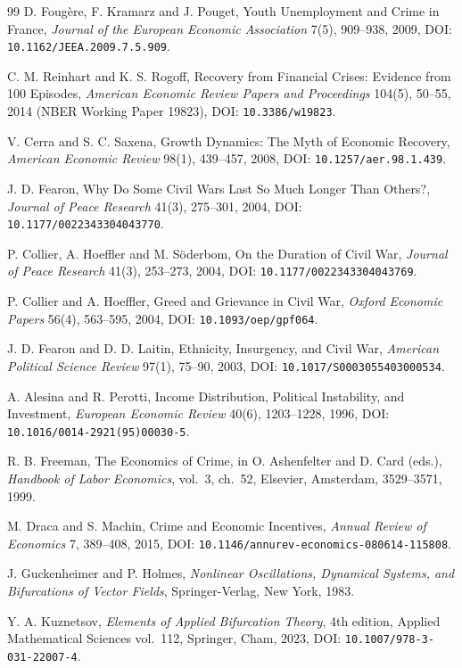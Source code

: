 \documentclass[review,12pt]{elsarticle}
\theoremstyle{plain}
\theoremstyle{definition}
\theoremstyle{remark}
\begin{document}
\begin{thebibliography}{99}
 D. Foug\`ere, F. Kramarz and J. Pouget, Youth Unemployment and Crime in France, \emph{Journal of the European Economic Association} 7(5), 909--938, 2009, DOI: \texttt{10.1162/JEEA.2009.7.5.909}.

 C. M. Reinhart and K. S. Rogoff, Recovery from Financial Crises: Evidence from 100 Episodes, \emph{American Economic Review Papers and Proceedings} 104(5), 50--55, 2014 (NBER Working Paper 19823), DOI: \texttt{10.3386/w19823}.

 V. Cerra and S. C. Saxena, Growth Dynamics: The Myth of Economic Recovery, \emph{American Economic Review} 98(1), 439--457, 2008, DOI: \texttt{10.1257/aer.98.1.439}.

 J. D. Fearon, Why Do Some Civil Wars Last So Much Longer Than Others?, \emph{Journal of Peace Research} 41(3), 275--301, 2004, DOI: \texttt{10.1177/0022343304043770}.

 P. Collier, A. Hoeffler and M. S\"oderbom, On the Duration of Civil War, \emph{Journal of Peace Research} 41(3), 253--273, 2004, DOI: \texttt{10.1177/0022343304043769}.

 P. Collier and A. Hoeffler, Greed and Grievance in Civil War, \emph{Oxford Economic Papers} 56(4), 563--595, 2004, DOI: \texttt{10.1093/oep/gpf064}.

 J. D. Fearon and D. D. Laitin, Ethnicity, Insurgency, and Civil War, \emph{American Political Science Review} 97(1), 75--90, 2003, DOI: \texttt{10.1017/S0003055403000534}.

 A. Alesina and R. Perotti, Income Distribution, Political Instability, and Investment, \emph{European Economic Review} 40(6), 1203--1228, 1996, DOI: \texttt{10.1016/0014-2921(95)00030-5}.

 R. B. Freeman, The Economics of Crime, in O. Ashenfelter and D. Card (eds.), \emph{Handbook of Labor Economics}, vol.~3, ch.~52, Elsevier, Amsterdam, 3529--3571, 1999.

 M. Draca and S. Machin, Crime and Economic Incentives, \emph{Annual Review of Economics} 7, 389--408, 2015, DOI: \texttt{10.1146/annurev-economics-080614-115808}.

 J. Guckenheimer and P. Holmes, \emph{Nonlinear Oscillations, Dynamical Systems, and Bifurcations of Vector Fields}, Springer-Verlag, New York, 1983.

 Y. A. Kuznetsov, \emph{Elements of Applied Bifurcation Theory}, 4th edition, Applied Mathematical Sciences vol.~112, Springer, Cham, 2023, DOI: \texttt{10.1007/978-3-031-22007-4}.


\end{thebibliography}
\end{document}
